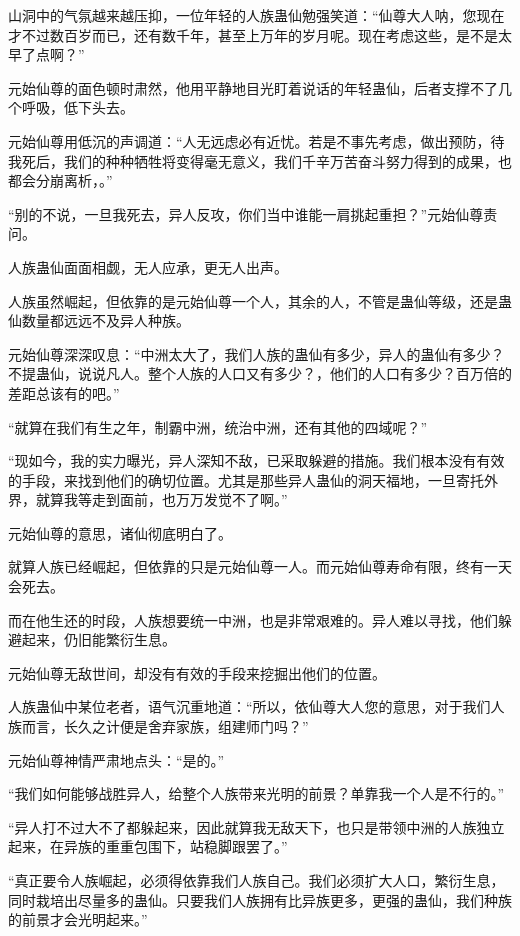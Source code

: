 
\begin{this_body}

山洞中的气氛越来越压抑，一位年轻的人族蛊仙勉强笑道：“仙尊大人呐，您现在才不过数百岁而已，还有数千年，甚至上万年的岁月呢。现在考虑这些，是不是太早了点啊？”

元始仙尊的面色顿时肃然，他用平静地目光盯着说话的年轻蛊仙，后者支撑不了几个呼吸，低下头去。

元始仙尊用低沉的声调道：“人无远虑必有近忧。若是不事先考虑，做出预防，待我死后，我们的种种牺牲将变得毫无意义，我们千辛万苦奋斗努力得到的成果，也都会分崩离析，。”

“别的不说，一旦我死去，异人反攻，你们当中谁能一肩挑起重担？”元始仙尊责问。

人族蛊仙面面相觑，无人应承，更无人出声。

人族虽然崛起，但依靠的是元始仙尊一个人，其余的人，不管是蛊仙等级，还是蛊仙数量都远远不及异人种族。

元始仙尊深深叹息：“中洲太大了，我们人族的蛊仙有多少，异人的蛊仙有多少？不提蛊仙，说说凡人。整个人族的人口又有多少？，他们的人口有多少？百万倍的差距总该有的吧。”

“就算在我们有生之年，制霸中洲，统治中洲，还有其他的四域呢？”

“现如今，我的实力曝光，异人深知不敌，已采取躲避的措施。我们根本没有有效的手段，来找到他们的确切位置。尤其是那些异人蛊仙的洞天福地，一旦寄托外界，就算我等走到面前，也万万发觉不了啊。”

元始仙尊的意思，诸仙彻底明白了。

就算人族已经崛起，但依靠的只是元始仙尊一人。而元始仙尊寿命有限，终有一天会死去。

而在他生还的时段，人族想要统一中洲，也是非常艰难的。异人难以寻找，他们躲避起来，仍旧能繁衍生息。

元始仙尊无敌世间，却没有有效的手段来挖掘出他们的位置。

人族蛊仙中某位老者，语气沉重地道：“所以，依仙尊大人您的意思，对于我们人族而言，长久之计便是舍弃家族，组建师门吗？”

元始仙尊神情严肃地点头：“是的。”

“我们如何能够战胜异人，给整个人族带来光明的前景？单靠我一个人是不行的。”

“异人打不过大不了都躲起来，因此就算我无敌天下，也只是带领中洲的人族独立起来，在异族的重重包围下，站稳脚跟罢了。”

“真正要令人族崛起，必须得依靠我们人族自己。我们必须扩大人口，繁衍生息，同时栽培出尽量多的蛊仙。只要我们人族拥有比异族更多，更强的蛊仙，我们种族的前景才会光明起来。”


\end{this_body}
